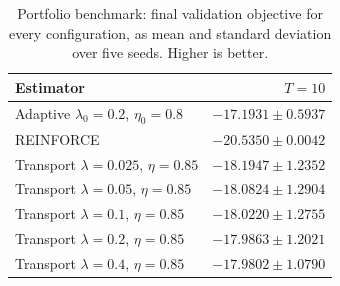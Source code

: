 \begin{table}[H]
\centering
\begin{tabular}{lr}
\toprule
Estimator & $T=10$ \\
\midrule
Adaptive $\lambda_0=0.2$, $\eta_0=0.8$ & $-17.1931\pm0.5937$ \\
REINFORCE & $-20.5350\pm0.0042$ \\
Transport $\lambda=0.025$, $\eta=0.85$ & $-18.1947\pm1.2352$ \\
Transport $\lambda=0.05$, $\eta=0.85$ & $-18.0824\pm1.2904$ \\
Transport $\lambda=0.1$, $\eta=0.85$ & $-18.0220\pm1.2755$ \\
Transport $\lambda=0.2$, $\eta=0.85$ & $-17.9863\pm1.2021$ \\
Transport $\lambda=0.4$, $\eta=0.85$ & $-17.9802\pm1.0790$ \\
\bottomrule
\end{tabular}
\caption{Portfolio benchmark: final validation objective for every configuration, as mean and standard deviation over five seeds. Higher is better.}
\label{tab:full-objectives-portfolio}
\end{table}
